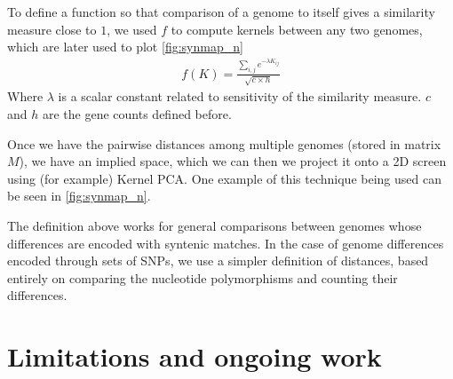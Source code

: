 \documentclass{vgtc}                      %
\begin{document}

To define a function so that comparison of a genome to itself gives a similarity measure close to $1$, we used $f$ to compute kernels between any two genomes, which are later used to plot \autoref{fig:synmap_n}
\begin{align}
f(K) = \frac{\sum_{i,j} e^{-\lambda K_{ij}}}{\sqrt{c \times h}}
\end{align}
Where $\lambda$ is a scalar constant related to sensitivity of the similarity measure. $c$ and $h$ are the gene counts defined before. 

Once we have the pairwise distances among multiple genomes (stored in matrix $M$), we have an implied space, which we can then we project it onto a 2D screen using (for example) Kernel PCA.
One example of this technique being used can be seen in \autoref{fig:synmap_n}.

The definition above works for general comparisons between genomes whose differences are encoded with syntenic matches.
In the case of genome differences encoded through sets of SNPs, we use a simpler definition of distances, based entirely on comparing the nucleotide polymorphisms and counting their differences.

\section{Limitations and ongoing work}
\end{document}
